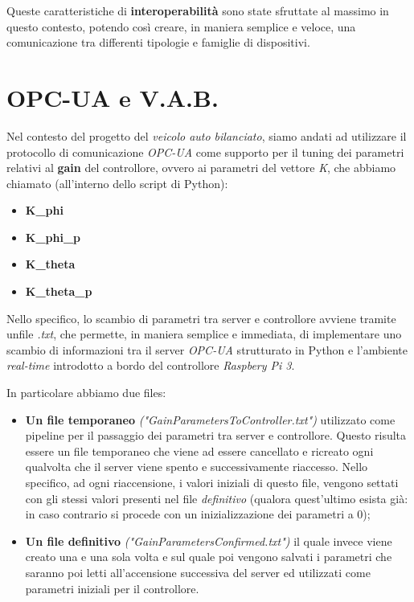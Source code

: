 Queste caratteristiche di \textbf{interoperabilità} sono state sfruttate al massimo in questo contesto, potendo così creare, in maniera semplice e veloce, una comunicazione tra differenti tipologie e famiglie di dispositivi.

\section{OPC-UA e V.A.B.}
Nel contesto del progetto del \textit{veicolo auto bilanciato}, siamo andati ad utilizzare il protocollo di comunicazione \textit{OPC-UA} come supporto per il tuning dei parametri relativi al \textbf{gain} del controllore, ovvero ai parametri del vettore \textit{K}, che abbiamo chiamato (all'interno dello script di Python):
\begin{itemize}
	\item \textbf{K\_phi}
	\item \textbf{K\_phi\_p}
	\item \textbf{K\_theta}
	\item \textbf{K\_theta\_p}
\end{itemize}

Nello specifico, lo scambio di parametri tra server e controllore avviene tramite unfile \textit{.txt}, che permette, in maniera semplice e immediata, di implementare uno scambio di informazioni tra il server \textit{OPC-UA} strutturato in Python e l'ambiente \textit{real-time} introdotto a bordo del controllore \textit{Raspbery Pi 3}.


In particolare abbiamo due files:
\begin{itemize}
	\item \textbf{Un file temporaneo} \textit{("GainParametersToController.txt")} utilizzato come pipeline per il passaggio dei parametri tra server e controllore. Questo risulta essere un file temporaneo che viene ad essere cancellato e ricreato ogni qualvolta che il server viene spento e successivamente riaccesso.
	Nello specifico, ad ogni riaccensione, i valori iniziali di questo file, vengono settati con gli stessi valori presenti nel file \textit{definitivo}  (qualora quest'ultimo esista già: in caso contrario si procede con un inizializzazione dei parametri a 0);
	
	\item \textbf{Un file definitivo} \textit{("GainParametersConfirmed.txt")} il quale invece viene creato una e una sola volta e sul quale poi vengono salvati i parametri che saranno poi letti all'accensione successiva del server ed utilizzati come parametri iniziali per il controllore.
\end{itemize}

